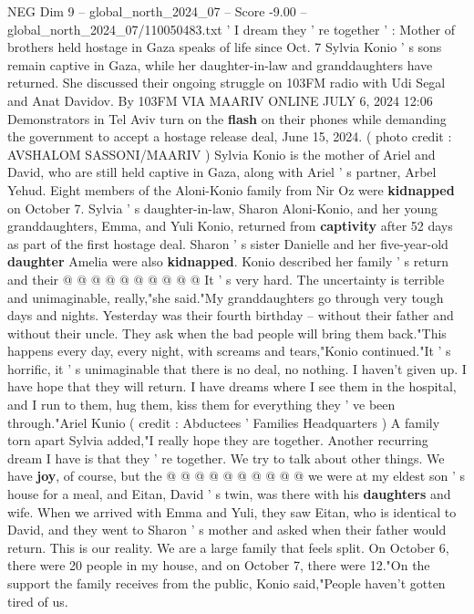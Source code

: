 \begin{textsample}{NEG Dim 9 – global\_north\_2024\_07 – Score -9.00 – global\_north\_2024\_07/110050483.txt}  \label{ex:f9_neg_151}
' I dream they ' re together ' : Mother of brothers held hostage in Gaza speaks of life since Oct. 7 Sylvia Konio ' s sons remain captive in Gaza, while her daughter-in-law and granddaughters have returned.
She discussed their ongoing struggle on 103FM radio with Udi Segal and Anat Davidov.
By 103FM VIA MAARIV ONLINE JULY 6, 2024 12:06 Demonstrators in Tel Aviv turn on the \textbf{flash} on their phones while demanding the government to accept a hostage release deal, June 15, 2024. ( photo credit : AVSHALOM SASSONI/MAARIV ) Sylvia Konio is the mother of Ariel and David, who are still held captive in Gaza, along with Ariel ' s partner, Arbel Yehud.
Eight members of the Aloni-Konio family from Nir Oz were \textbf{kidnapped} on October 7.
Sylvia ' s daughter-in-law, Sharon Aloni-Konio, and her young granddaughters, Emma, and Yuli Konio, returned from \textbf{captivity} after 52 days as part of the first hostage deal.
Sharon ' s sister Danielle and her five-year-old \textbf{daughter} Amelia were also \textbf{kidnapped}.
Konio described her family ' s return and their @ @ @ @ @ @ @ @ @ @ It ' s very hard.
The uncertainty is terrible and unimaginable, really,"she said."My granddaughters go through very tough days and nights.
Yesterday was their fourth birthday -- without their father and without their uncle.
They ask when the bad people will bring them back."This happens every day, every night, with screams and tears,"Konio continued."It ' s horrific, it ' s unimaginable that there is no deal, no nothing.
I haven't given up.
I have hope that they will return.
I have dreams where I see them in the hospital, and I run to them, hug them, kiss them for everything they ' ve been through."Ariel Kunio ( credit : Abductees ' Families Headquarters ) A family torn apart Sylvia added,"I really hope they are together.
Another recurring dream I have is that they ' re together.
We try to talk about other things.
We have \textbf{joy}, of course, but the @ @ @ @ @ @ @ @ @ @ we were at my eldest son ' s house for a meal, and Eitan, David ' s twin, was there with his \textbf{daughters} and wife.
When we arrived with Emma and Yuli, they saw Eitan, who is identical to David, and they went to Sharon ' s mother and asked when their father would return.
This is our reality.
We are a large family that feels split.
On October 6, there were 20 people in my house, and on October 7, there were 12."On the support the family receives from the public, Konio said,"People haven't gotten tired of us.

\end{textsample}

